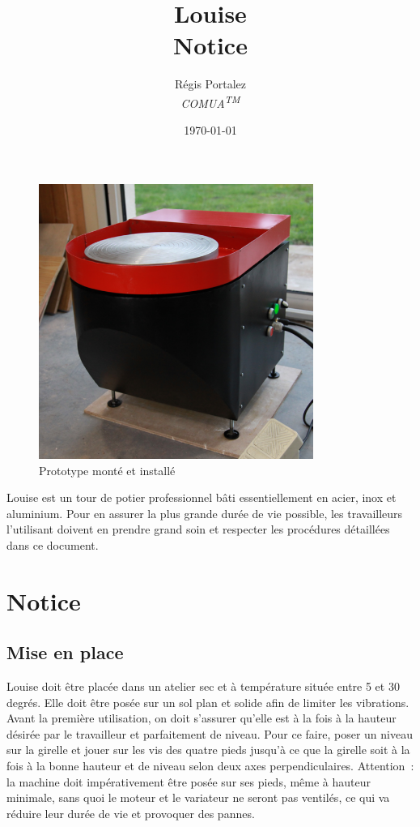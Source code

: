 \documentclass[a4paper]{article}
\author{Régis Portalez\\
\large \textit{COMUA\textsuperscript{TM}}}
\date{\today}
\title{Louise\\Notice}
\begin{document}
\maketitle

\begin{figure}[H]
    \centering
    \includegraphics*[width=0.8\textwidth]{../images/prototype}
    \caption{Prototype monté et installé}
    \label{fig:prototype}
\end{figure}
Louise est un tour de potier professionnel bâti essentiellement en acier, inox et aluminium. Pour en
assurer la plus grande durée de vie possible, les travailleurs l’utilisant doivent en prendre grand soin
et respecter les procédures détaillées dans ce document.
\newpage
\tableofcontents
\newpage
\section{Notice}
\subsection{Mise en place}
Louise doit être placée dans un atelier sec et à température située entre 5 et 30 degrés. Elle doit
être posée sur un sol plan et solide afin de limiter les vibrations. Avant la première utilisation, on
doit s’assurer qu’elle est à la fois à la hauteur désirée par le travailleur et parfaitement de niveau.
Pour ce faire, poser un niveau sur la girelle et jouer sur les vis des quatre pieds jusqu’à ce que la
girelle soit à la fois à la bonne hauteur et de niveau selon deux axes perpendiculaires.
Attention~: la machine doit impérativement être posée sur ses pieds, même à hauteur minimale, sans
quoi le moteur et le variateur ne seront pas ventilés, ce qui va réduire leur durée de vie et provoquer
des pannes.
\end{document}

